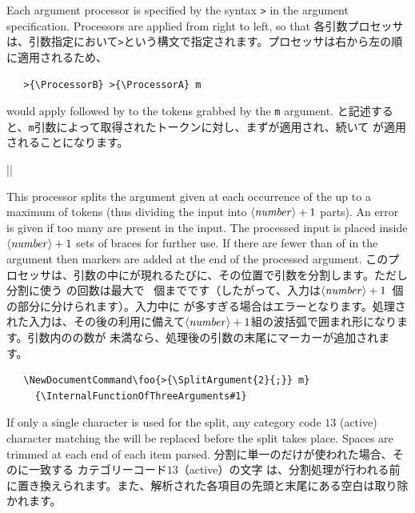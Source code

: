 \documentclass{ltxguide}
\newcommand\jpnewline{\vspace{3pt}\newline}
\begin{document}
Each argument processor is specified by the syntax \texttt{>}
in the argument specification. Processors are applied from right to left, so
that
\jpnewline
各引数プロセッサは、引数指定において\texttt{>}という構文で指定されます。プロセッサは右から左の順に適用されるため、
\begin{verbatim}
   >{\ProcessorB} >{\ProcessorA} m
\end{verbatim}
would apply  followed by  to the tokens grabbed
by the \texttt{m} argument.
\jpnewline
と記述すると、\texttt{m}引数によって取得されたトークンに対し、まずが適用され、続いて が適用されることになります。

\begin{decl}
  |\SplitArgument|  
\end{decl}
This processor splits the argument given at each occurrence of the
 up to a maximum of  tokens (thus
dividing the input into $\text{\meta{number}} + 1$ parts).
An error is given if too many  are present in the
input. The processed input is placed inside
$\text{\meta{number}} + 1$ sets of braces for further use.
If there are fewer than  of  in the argument
then  markers are added at the end of the processed
argument.
\jpnewline
このプロセッサは、引数の中にが現れるたびに、その位置で引数を分割します。ただし分割に使う の回数は最大で ~個までです（したがって、入力は\(\text{\meta{number}} + 1\)~個の部分に分けられます）。入力中に が多すぎる場合はエラーとなります。処理された入力は、その後の利用に備えて\(\text{\meta{number}} + 1\)組の波括弧で囲まれ形になります。引数内のの数が 未満なら、処理後の引数の末尾にマーカーが追加されます。

\begin{verbatim}
   \NewDocumentCommand\foo{>{\SplitArgument{2}{;}} m}
     {\InternalFunctionOfThreeArguments#1}
\end{verbatim}
If only a single character  is used for the split, any
category code $13$ (active) character matching the  will
be replaced before the split takes place.
Spaces are trimmed at each end of each item parsed.
\jpnewline
分割に単一のだけが使われた場合、そのに一致する カテゴリーコード$13$（active）の文字 は、分割処理が行われる前に置き換えられます。また、解析された各項目の先頭と末尾にある空白は取り除かれます。
\end{document}
